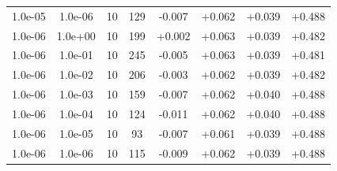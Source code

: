 \documentclass[11pt,a4paper]{article}
\begin{document}
\begin{table}
{\begin{tabular}{*{8}c}
 1.0e-05 	 & 1.0e-06 	 & 10 & 129 	 & -0.007 & +0.062 & +0.039 & +0.488 \\ 
 1.0e-06 	 & 1.0e+00 	 & 10 & 199 	 & +0.002 & +0.063 & +0.039 & +0.482 \\ 
 1.0e-06 	 & 1.0e-01 	 & 10 & 245 	 & -0.005 & +0.063 & +0.039 & +0.481 \\ 
 1.0e-06 	 & 1.0e-02 	 & 10 & 206 	 & -0.003 & +0.062 & +0.039 & +0.482 \\ 
 1.0e-06 	 & 1.0e-03 	 & 10 & 159 	 & -0.007 & +0.062 & +0.040 & +0.488 \\ 
 1.0e-06 	 & 1.0e-04 	 & 10 & 124 	 & -0.011 & +0.062 & +0.040 & +0.488 \\ 
 1.0e-06 	 & 1.0e-05 	 & 10 & 93 	 & -0.007 & +0.061 & +0.039 & +0.488 \\ 
 1.0e-06 	 & 1.0e-06 	 & 10 & 115 	 & -0.009 & +0.062 & +0.039 & +0.488 \\ 
\end{tabular}}
\label{Tab::1}
\end{table} 
\end{document}
